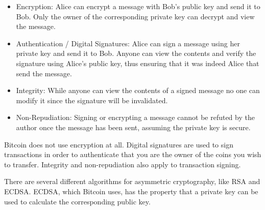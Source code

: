 \begin{itemize}
\item Encryption: Alice can encrypt a message with Bob’s public key and send it to Bob. Only the owner of the corresponding private key can decrypt and view the message.
\item Authentication / Digital Signatures: Alice can sign a message using her private key and send it to Bob. Anyone can view the contents and verify the signature using Alice’s public key, thus ensuring that it was indeed Alice that send the message.
\item Integrity: While anyone can view the contents of a signed message no one can modify it since the signature will be invalidated.
\item Non-Repudiation: Signing or encrypting a message cannot be refuted by the author once the message has been sent, assuming the private key is secure.
\end{itemize}


\begin{note}
Bitcoin does not use encryption at all. Digital signatures are used to sign transactions in order to authenticate that you are the owner of the coins you wish to transfer. Integrity and non-repudiation also apply to transaction signing.
\end{note}

There are several different algorithms for asymmetric cryptography, like RSA and ECDSA. ECDSA, which Bitcoin uses, has the property that a private key can be used to calculate the corresponding public key.


